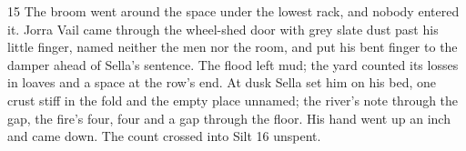 \begin{CRchronicle}{15}
The broom went around the space under the lowest rack, and nobody entered it. Jorra Vail came through the wheel-shed door with grey slate dust past his little finger, named neither the men nor the room, and put his bent finger to the damper ahead of Sella’s sentence. The flood left mud; the yard counted its losses in loaves and a space at the row’s end. At dusk Sella set him on his bed, one crust stiff in the fold and the empty place unnamed; the river’s note through the gap, the fire’s four, four and a gap through the floor. His hand went up an inch and came down. The count crossed into Silt 16 unspent.
\end{CRchronicle}
